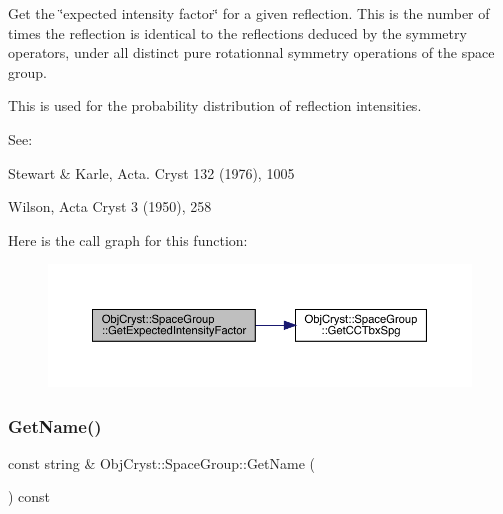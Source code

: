 Get the \char`\"{}expected intensity factor\char`\"{} for a given reflection. This is the number of times the reflection is identical to the reflections deduced by the symmetry operators, under all distinct pure rotationnal symmetry operations of the space group.

This is used for the probability distribution of reflection intensities.

See\+:
\begin{DoxyItemize}
\item Stewart \& Karle, Acta. Cryst 132 (1976), 1005
\item Wilson, Acta Cryst 3 (1950), 258 
\end{DoxyItemize}Here is the call graph for this function\+:
\nopagebreak
\begin{figure}[H]
\begin{center}
\leavevmode
\includegraphics[width=350pt]{class_obj_cryst_1_1_space_group_a6f0b08e8a3e713b596bc424407859d7a_cgraph}
\end{center}
\end{figure}
\mbox{\label{class_obj_cryst_1_1_space_group_a4b8bd009db507295c21fa88ad154a8a6}} 
\subsubsection{\texorpdfstring{GetName()}{GetName()}}
{\footnotesize\ttfamily const string \& Obj\+Cryst\+::\+Space\+Group\+::\+Get\+Name (\begin{DoxyParamCaption}{ }\end{DoxyParamCaption}) const}

